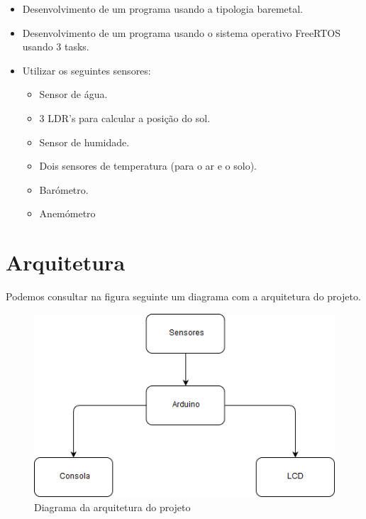 \documentclass[11pt]{report}
\begin{document}
\begin{itemize}
\item Desenvolvimento de um programa usando a tipologia baremetal.
\item Desenvolvimento de um programa usando o sistema operativo FreeRTOS usando 3 tasks.
\item Utilizar os seguintes sensores:
\begin{itemize}
\item Sensor de água.
\item 3 LDR's para calcular a posição do sol.
\item Sensor de humidade.
\item Dois sensores de temperatura (para o ar e o solo).
\item Barómetro.
\item Anemómetro 
\end{itemize}
\end{itemize}


\clearpage


\chapter*{Arquitetura}

Podemos consultar na figura seguinte um diagrama com a arquitetura do projeto.


\begin{figure} [!h]
\centering
\includegraphics[width=\textwidth]{Prints/arquitectura.png}
\caption{Diagrama da arquitetura do projeto}
\label{Rotulo}
\end{figure}


\clearpage


\end{document}
